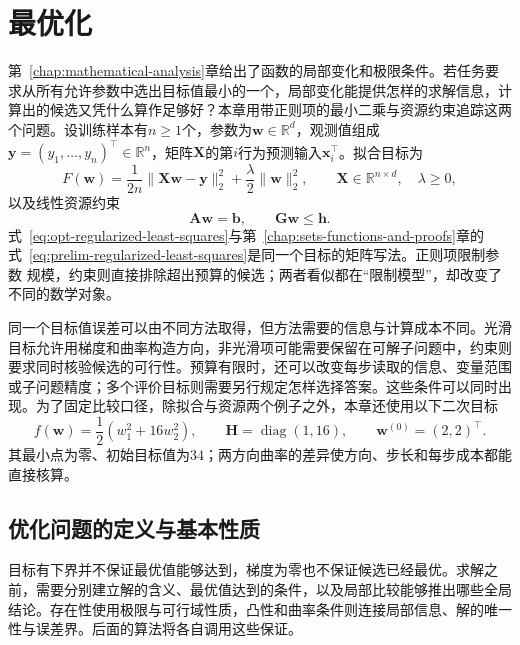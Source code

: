 \chapter{最优化}
\label{chap:optimization}

第~\ref{chap:mathematical-analysis}章给出了函数的局部变化和极限条件。若任务要求从所有允许参数中选出目标值最小的一个，局部变化能提供怎样的求解信息，计算出的候选又凭什么算作足够好？本章用带正则项的最小二乘与资源约束追踪这两个问题。设训练样本有$n\geq1$个，参数为$\bm w\in\mathbb R^d$，观测值组成$\bm y=(y_1,\ldots,y_n)^\top\in\mathbb R^n$，矩阵$\bm X$的第$i$行为预测输入$\bm x_i^\top$。拟合目标为
\begin{equation}
  F(\bm{w})
  =
  \frac{1}{2n}\lVert \bm{X}\bm{w}-\bm{y}\rVert_2^2
  +\frac{\lambda}{2}\lVert\bm{w}\rVert_2^2,
  \qquad
  \bm{X}\in\mathbb{R}^{n\times d},\quad \lambda\geq 0,
  \label{eq:opt-regularized-least-squares}
\end{equation}
以及线性资源约束
\begin{equation}
  \bm{A}\bm{w}=\bm{b},\qquad
  \bm{G}\bm{w}\leq\bm{h}.
  \label{eq:opt-linear-resource-constraints}
\end{equation}
式~\eqref{eq:opt-regularized-least-squares}与第~\ref{chap:sets-functions-and-proofs}章的
式~\eqref{eq:prelim-regularized-least-squares}是同一个目标的矩阵写法。正则项限制参数
规模，约束则直接排除超出预算的候选；两者看似都在“限制模型”，却改变了不同的数学对象。

同一个目标值误差可以由不同方法取得，但方法需要的信息与计算成本不同。光滑目标允许用梯度和曲率构造方向，非光滑项可能需要保留在可解子问题中，约束则要求同时核验候选的可行性。预算有限时，还可以改变每步读取的信息、变量范围或子问题精度；多个评价目标则需要另行规定怎样选择答案。这些条件可以同时出现。为了固定比较口径，除拟合与资源两个例子之外，本章还使用以下二次目标
\begin{equation}
 f(\bm w)=\frac12(w_1^2+16w_2^2),\qquad
 \bm H=\operatorname{diag}(1,16),\qquad
 \bm w^{(0)}=(2,2)^\top.
 \label{eq:opt-common-quadratic}
\end{equation}
其最小点为零、初始目标值为$34$；两方向曲率的差异使方向、步长和每步成本都能直接核算。

\section{优化问题的定义与基本性质}
\label{sec:opt-objectives-solutions-curvature}

目标有下界并不保证最优值能够达到，梯度为零也不保证候选已经最优。求解之前，需要分别建立解的含义、最优值达到的条件，以及局部比较能够推出哪些全局结论。存在性使用极限与可行域性质，凸性和曲率条件则连接局部信息、解的唯一性与误差界。后面的算法将各自调用这些保证。

